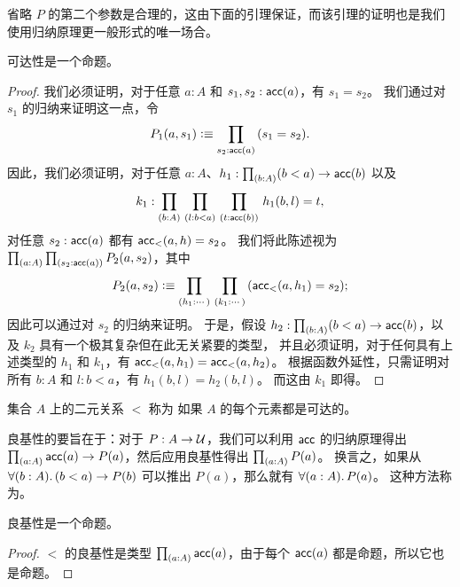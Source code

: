 省略 $P$ 的第二个参数是合理的，这由下面的引理保证，而该引理的证明也是我们使用归纳原理更一般形式的唯一场合。

\begin{lem}
  可达性是一个命题。
\end{lem}

\begin{proof}
  我们必须证明，对于任意 $a:A$ 和 $s_1,s_2:\mathsf{acc}(a)$，有 $s_1=s_2$。
  我们通过对 $s_1$ 的归纳来证明这一点，令
  \[P_1(a,s_1) \defeq \prd{s_2:\acc(a)} (s_1=s_2). \]
  因此，我们必须证明，对于任意 $a:A$、${h_1:\prd{b:A} (b<a) \to \acc(b)}$ 以及
  \[ k_1:{\prd{b:A}{l:b<a}{t:\acc(b)} h_1(b,l) = t},\]
  对任意 $s_2:\mathsf{acc}(a)$ 都有 $\mathsf{acc}_<(a,h) = s_2$。
  我们将此陈述视为 $\prd{a:A}{s_2:\acc(a)} P_2(a,s_2)$，其中
  \[P_2(a,s_2) \defeq
  \prd{h_1 : \cdots } %
  {k_1 : \cdots} %
  (\acc_<(a,h_1) = s_2);
  \]
  因此可以通过对 $s_2$ 的归纳来证明。
  于是，假设 $h_2 : \prd{b:A} (b<a) \to \acc(b)$，以及 $k_2$ 具有一个极其复杂但在此无关紧要的类型，
  并且必须证明，对于任何具有上述类型的 $h_1$ 和 $k_1$，有 $\mathsf{acc}_<(a,h_1) = \mathsf{acc}_<(a,h_2)$。
  根据函数外延性，只需证明对所有 $b:A$ 和 $l:b<a$，有 $h_1(b,l) = h_2(b,l)$。
  而这由 $k_1$ 即得。
\end{proof}

\begin{defn}
  集合 $A$ 上的二元关系 $<$ 称为
  如果 $A$ 的每个元素都是可达的。
\end{defn}

良基性的要旨在于：对于 $P:A\to \mathcal{U}$，我们可以利用 $\mathsf{acc}$ 的归纳原理得出 $\prd{a:A} \acc(a) \to P(a)$，然后应用良基性得出 $\prd{a:A} P(a)$。
换言之，如果从 $\fall{b:A} (b<a) \to P(b)$ 可以推出 $P(a)$，那么就有 $\fall{a:A} P(a)$。
这种方法称为。

\begin{lem}
  良基性是一个命题。
\end{lem}

\begin{proof}
  $<$ 的良基性是类型 $\prd{a:A} \acc(a)$，由于每个 $\mathsf{acc}(a)$ 都是命题，所以它也是命题。
\end{proof}

